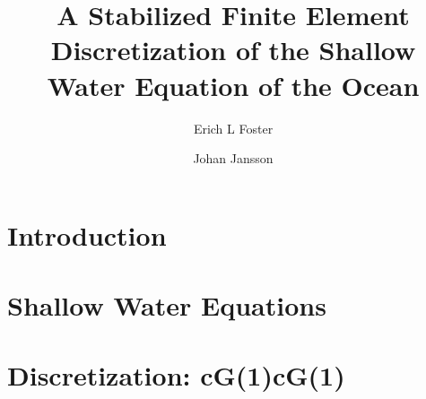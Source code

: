 \documentclass{elsarticle}
\begin{document}
  \begin{frontmatter}
    \author[1]{Erich L Foster}

    \author[1]{Johan Jansson}

    \address[1]{Basque Center for Applied Mathematics, Alameda Mazarredo, 14,
      48009 Bilbao, Basque Country -- Spain}

    \title{A Stabilized Finite Element Discretization of the Shallow Water Equation of the Ocean}

    \begin{abstract}
    \end{abstract}
  \end{frontmatter}

  \section{Introduction} \label{sec:Intro}
  

  \section{Shallow Water Equations}
  

  \section{Discretization: cG(1)cG(1)}
  

  

  
  
\end{document}
